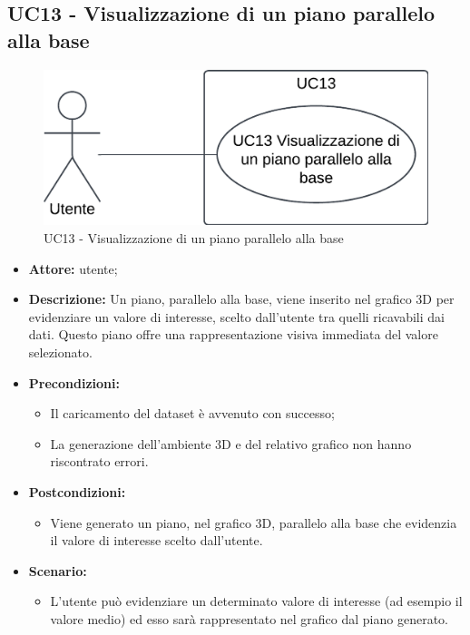 \subsection{UC13 - Visualizzazione di un piano parallelo alla base}
\begin{figure}[h!]\centering
    \includegraphics[scale=0.7]{template/images/UC13.png}
    \caption{UC13 - Visualizzazione di un piano parallelo alla base}
\end{figure}
\begin{itemize}    
    \item \textbf{Attore:} utente;
    \item \textbf{Descrizione:} Un piano, parallelo alla base, viene inserito nel grafico 3D per evidenziare un valore di interesse, scelto dall'utente tra quelli ricavabili dai dati. Questo piano offre una rappresentazione visiva immediata del valore selezionato.
    \item \textbf{Precondizioni:}    
        \begin{itemize}
            \item Il caricamento del dataset è avvenuto con successo;
            \item La generazione dell'ambiente 3D e del relativo grafico non hanno riscontrato errori.
        \end{itemize}    
    \item \textbf{Postcondizioni:}
        \begin{itemize}
            \item Viene generato un piano, nel grafico 3D, parallelo alla base che evidenzia il valore di interesse scelto dall'utente.
        \end{itemize}    
    \item \textbf{Scenario:} 
        \begin{itemize}
            \item L'utente può evidenziare un determinato valore di interesse (ad esempio il valore medio) ed esso sarà rappresentato nel grafico dal piano generato.
        \end{itemize}
\end{itemize}

